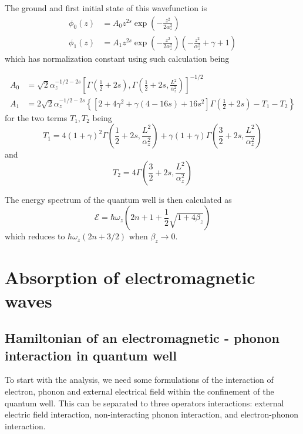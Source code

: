 \documentclass{article}
\begin{document}
The ground and first initial state of this wavefunction is 
\begin{align}
    \phi_{0}(z) & = A_{0}z^{2s}\exp{\left(-\frac{z^{2}}{2\alpha^{2}_{z}}\right)} \\
    \phi_{1}(z) & = A_{1} z^{2s}\exp{\left( -\frac{z^{2}}{2\alpha^{2}_{z}} \right)} \left(-\frac{z^{2}}{\alpha_{z}^{2}}+\gamma + 1\right)
\end{align}
which has normalization constant using such calculation being 

\begin{align}
    A_{0} & = \sqrt{2}\alpha_{z}^{-1/2-2s} \left[\Gamma \left(\frac{1}{2}+2s\right), \Gamma\left(\frac{1}{2}+2s, \frac{L^{2}}{\alpha_{z}^{2}}\right)\right]^{-1/2}\\
    A_{1} & = 2\sqrt{2} \alpha_{z}^{-1/2-2s} \left\{ \left[2+4\gamma^{2}+\gamma(4-16s)+16s^{2}\right] \Gamma\left(\frac{1}{2}+2s\right)- T_{1} - T_{2}\right\}
\end{align}
for the two terms $T_{1},T_{2}$ being
\begin{equation}
    T_{1} = 4(1+\gamma)^{2} \Gamma\left(\frac{1}{2}+2s, \frac{L^{2}}{\alpha_{z}^{2}}\right) + \gamma(1+\gamma) \Gamma \left(\frac{3}{2}+2s, \frac{L^{2}}{\alpha_{z}^{2}}\right)
\end{equation}
and 
\begin{equation}
    T_{2} = 4\Gamma \left(\frac{3}{2}+2s, \frac{L^{2}}{\alpha_{z}^{2}} \right)
\end{equation}

The energy spectrum of the quantum well is then calculated as 
\begin{equation}
    \mathcal{E} = \hbar \omega_{z} \left( 2n+1 + \frac{1}{2}\sqrt{1+4\beta_{z}} \right)
\end{equation}
which reduces to $\hbar\omega_{z}(2n+3/2)$ when $\beta_{z}\to 0$. 

\section{Absorption of electromagnetic waves}

\subsection{Hamiltonian of an electromagnetic - phonon interaction in quantum well}

To start with the analysis, we need some formulations of the interaction of electron, phonon and external electrical field within the confinement of the quantum well. This can be separated to three operators interactions: external electric field interaction, non-interacting phonon interaction, and electron-phonon interaction. 
\end{document}
